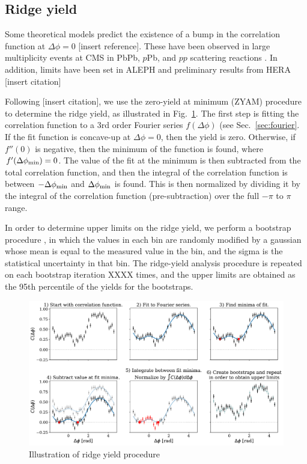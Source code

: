 \subsection{Ridge yield}
Some theoretical models predict the existence of a bump in the correlation function at $\Delta\phi=0$ [insert reference].  These have been observed in large multiplicity events at CMS in PbPb, $p$Pb, and $pp$  scattering reactions \cite{Khachatryan:2010gv,CMS:2012qk,Khachatryan:2015lva}.  In addition, limits have been set in ALEPH \cite{Lee:2019tmr} and preliminary results from HERA [insert citation] 

Following [insert citation], we use the zero-yield at minimum (ZYAM) procedure to determine the ridge yield, as illustrated in Fig.~\ref{fig:ridge_yield_procedure}.   The first step is fitting the correlation function to a 3rd order Fourier series $f(\Delta\phi)$ (see Sec.~\ref{sec:fourier}.  If the fit function is concave-up at $\Delta\phi=0$, then the yield is zero.  Otherwise, if $f''(0)$ is negative, then the minimum of the function is found, where $f'(\Delta\phi_{\rm min})=0$.  The value of the fit at the minimum is then subtracted from the total correlation function, and then the integral of the correlation function is between $-\Delta\phi_{\rm min}$ and $\Delta\phi_{\rm min}$ is found.  This is then normalized by dividing it by the integral of the correlation function (pre-subtraction) over the full $-\pi$ to $\pi$ range. 

In order to determine upper limits on the ridge yield, we perform a bootstrap procedure \cite{10.1214/aos/1176344552}, in which the values in each bin are randomly modified by a gaussian whose mean is equal to the measured value in the bin, and the sigma is the statistical uncertainty in that bin.  The ridge-yield analysis procedure is repeated on each bootstrap iteration XXXX times, and the upper limits are obtained as the 95th percentile of the yields for the bootstraps.  

\begin{figure}
    \centering
    \includegraphics[width=\textwidth]{ridge_yield_procedure.pdf}
    \caption{Illustration of ridge yield procedure}
    \label{fig:ridge_yield_procedure}
\end{figure}


